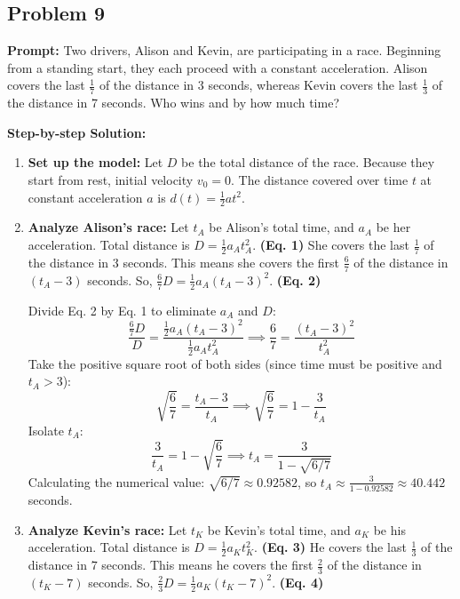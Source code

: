 \documentclass[11pt]{article}
\begin{document}
\subsection*{Problem 9}
\textbf{Prompt:} Two drivers, Alison and Kevin, are participating in a race. Beginning from a standing start, they each proceed with a constant acceleration. Alison covers the last $\frac{1}{7}$ of the distance in 3 seconds, whereas Kevin covers the last $\frac{1}{3}$ of the distance in 7 seconds. Who wins and by how much time?
\vspace{0.2cm}

\noindent\textbf{Step-by-step Solution:}
\begin{enumerate}
    \item \textbf{Set up the model:}
    Let $D$ be the total distance of the race.
    Because they start from rest, initial velocity $v_0 = 0$. The distance covered over time $t$ at constant acceleration $a$ is $d(t) = \frac{1}{2}at^2$.
    
    \item \textbf{Analyze Alison's race:}
    Let $t_A$ be Alison's total time, and $a_A$ be her acceleration.
    Total distance is $D = \frac{1}{2}a_A t_A^2$. \quad \textbf{(Eq. 1)}
    She covers the last $\frac{1}{7}$ of the distance in $3$ seconds. This means she covers the first $\frac{6}{7}$ of the distance in $(t_A - 3)$ seconds.
    So, $\frac{6}{7}D = \frac{1}{2}a_A (t_A - 3)^2$. \quad \textbf{(Eq. 2)}
    
    Divide Eq. 2 by Eq. 1 to eliminate $a_A$ and $D$:
    \[ \frac{\frac{6}{7}D}{D} = \frac{\frac{1}{2}a_A (t_A - 3)^2}{\frac{1}{2}a_A t_A^2} \implies \frac{6}{7} = \frac{(t_A - 3)^2}{t_A^2} \]
    Take the positive square root of both sides (since time must be positive and $t_A > 3$):
    \[ \sqrt{\frac{6}{7}} = \frac{t_A - 3}{t_A} \implies \sqrt{\frac{6}{7}} = 1 - \frac{3}{t_A} \]
    Isolate $t_A$:
    \[ \frac{3}{t_A} = 1 - \sqrt{\frac{6}{7}} \implies t_A = \frac{3}{1 - \sqrt{6/7}} \]
    Calculating the numerical value: $\sqrt{6/7} \approx 0.92582$, so $t_A \approx \frac{3}{1 - 0.92582} \approx 40.442$ seconds.

    \item \textbf{Analyze Kevin's race:}
    Let $t_K$ be Kevin's total time, and $a_K$ be his acceleration.
    Total distance is $D = \frac{1}{2}a_K t_K^2$. \quad \textbf{(Eq. 3)}
    He covers the last $\frac{1}{3}$ of the distance in $7$ seconds. This means he covers the first $\frac{2}{3}$ of the distance in $(t_K - 7)$ seconds.
    So, $\frac{2}{3}D = \frac{1}{2}a_K (t_K - 7)^2$. \quad \textbf{(Eq. 4)}
    

\end{enumerate}
\end{document}
